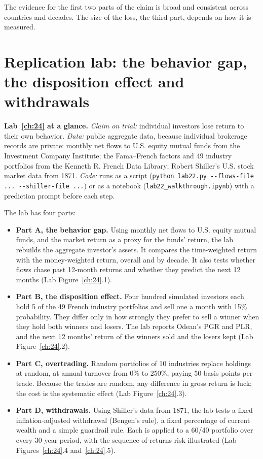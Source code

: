 The evidence for the first two parts of the claim is broad and consistent across countries and decades. The size of the loss, the third part, depends on how it is measured.

\section{Replication lab: the behavior gap, the disposition effect and withdrawals}
\label{sec:24-lab}

\begin{callout}
\textbf{Lab~\ref{ch:24} at a glance.} \emph{Claim on trial:} individual investors lose return to their own behavior. \emph{Data:} public aggregate data, because individual brokerage records are private: monthly net flows to U.S. equity mutual funds from the Investment Company Institute; the Fama--French factors and 49 industry portfolios from the Kenneth R. French Data Library; Robert Shiller's U.S. stock market data from 1871. \emph{Code:} runs as a script (\texttt{python lab22.py -{}-flows-file ... -{}-shiller-file ...}) or as a notebook (\texttt{lab22\_walkthrough.ipynb}) with a prediction prompt before each step.
\end{callout}

The lab has four parts:

\begin{itemize}
  \item \textbf{Part A, the behavior gap.} Using monthly net flows to U.S. equity mutual funds, and the market return as a proxy for the funds' return, the lab rebuilds the aggregate investor's assets. It compares the time-weighted return with the money-weighted return, overall and by decade. It also tests whether flows chase past 12-month returns and whether they predict the next 12 months (Lab Figure~\ref{ch:24}.1).
  \item \textbf{Part B, the disposition effect.} Four hundred simulated investors each hold 5 of the 49 French industry portfolios and sell one a month with 15\% probability. They differ only in how strongly they prefer to sell a winner when they hold both winners and losers. The lab reports Odean's PGR and PLR, and the next 12 months' return of the winners sold and the losers kept (Lab Figure~\ref{ch:24}.2).
  \item \textbf{Part C, overtrading.} Random portfolios of 10 industries replace holdings at random, at annual turnover from 0\% to 250\%, paying 50 basis points per trade. Because the trades are random, any difference in gross return is luck; the cost is the systematic effect (Lab Figure~\ref{ch:24}.3).
  \item \textbf{Part D, withdrawals.} Using Shiller's data from 1871, the lab tests a fixed inflation-adjusted withdrawal (Bengen's rule), a fixed percentage of current wealth and a simple guardrail rule. Each is applied to a 60/40 portfolio over every 30-year period, with the sequence-of-returns risk illustrated (Lab Figures~\ref{ch:24}.4 and~\ref{ch:24}.5).
\end{itemize}

